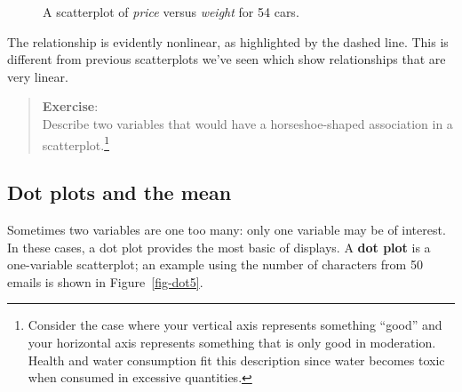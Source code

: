 \documentclass[
  letterpaper,
  DIV=11,
  numbers=noendperiod]{scrreprt}
\begin{document}
\begin{figure}


\caption{\label{fig-scat53}A scatterplot of \emph{price} versus
\emph{weight} for 54 cars.}

\end{figure}%

The relationship is evidently nonlinear, as highlighted by the dashed
line. This is different from previous scatterplots we've seen which show
relationships that are very linear.

\begin{quote}
\textbf{Exercise}:\\
Describe two variables that would have a horseshoe-shaped association in
a scatterplot.\footnote{Consider the case where your vertical axis
  represents something ``good'' and your horizontal axis represents
  something that is only good in moderation. Health and water
  consumption fit this description since water becomes toxic when
  consumed in excessive quantities.}
\end{quote}

\subsection{Dot plots and the mean}\label{dot-plots-and-the-mean}

Sometimes two variables are one too many: only one variable may be of
interest. In these cases, a dot plot provides the most basic of
displays. A \textbf{dot plot} is a one-variable scatterplot; an example
using the number of characters from 50 emails is shown in
Figure~\ref{fig-dot5}.
\end{document}

